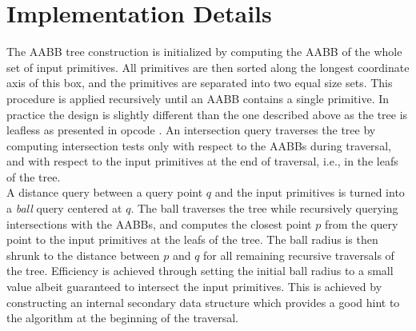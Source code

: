 \section{Implementation Details}
\label{AABB_tree_section_details}

The AABB tree construction is initialized by computing the AABB of the whole set of input primitives. All primitives are then sorted along the longest coordinate axis of this box, and the primitives are separated into two equal size sets. This procedure is applied recursively until an AABB contains a single primitive. In practice the design is slightly different than the one described above as the tree is leafless as presented in {\sc opcode} \cite{cgal:t-ocdl-05}. An intersection query traverses the tree by computing intersection tests only with respect to the AABBs during traversal, and with respect to the input primitives at the end of traversal, i.e., in the leafs of the tree.\\

A distance query between a query point $q$ and the input primitives is turned into a \emph{ball} query centered at $q$. The ball traverses the tree while recursively querying intersections with the AABBs, and computes the closest point $p$ from the query point to the input primitives at the leafs of the tree. The ball radius is then shrunk to the distance between $p$ and $q$ for all remaining recursive traversals of the tree. Efficiency is achieved through setting the initial ball radius to a small value albeit guaranteed to intersect the input primitives. This is achieved by constructing an internal secondary data structure which provides a good hint to the algorithm at the beginning of the traversal.
